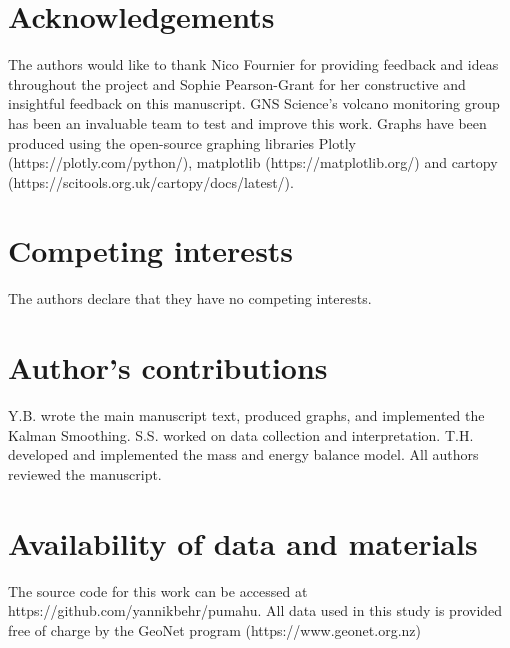 \documentclass[doublespacing, linenumbers]{bmcart}
\begin{document}
\begin{backmatter}

\section*{Acknowledgements}
The authors would like to thank Nico Fournier for providing feedback and ideas
throughout the project and Sophie Pearson-Grant for her constructive and
insightful feedback on this manuscript. GNS Science's volcano monitoring group
has been an invaluable team to test and improve this work. Graphs have been
produced using the open-source graphing libraries Plotly
(https://plotly.com/python/), matplotlib (https://matplotlib.org/) and cartopy
(https://scitools.org.uk/cartopy/docs/latest/).

\section*{Competing interests}
The authors declare that they have no competing interests.

\section*{Author's contributions}
  Y.B. wrote the main manuscript text, produced graphs, and implemented the
  Kalman Smoothing. S.S. worked on data collection and interpretation. T.H.
  developed and implemented the mass and energy balance model. All
  authors reviewed the manuscript.

\section*{Availability of data and materials}%
The source code for this work can be accessed at
https://github.com/yannikbehr/pumahu. All data used in this study is provided
free of charge by the GeoNet program (https://www.geonet.org.nz)



\end{backmatter}
\end{document}
